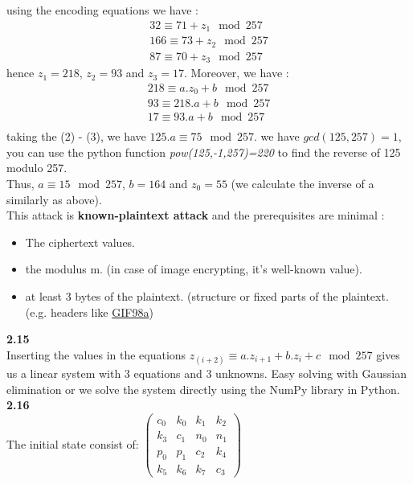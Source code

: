 using the encoding equations we have : 
\begin{align*}
    32 \equiv 71 + z_1 \mod{257} \\
    166 \equiv 73 + z_2 \mod{257}\\
    87 \equiv 70 + z_3 \mod{257}
\end{align*}
hence $z_1 = 218$, $z_2 = 93$ and $z_3 = 17$. Moreover, we have : 
\begin{align*}
    218 \equiv a.z_0 + b \mod{257} \\
     93 \equiv 218.a + b \mod{257} \\
    17 \equiv 93.a + b \mod{257} \\
\end{align*}
taking the (2) - (3), we have $125.a \equiv 75 \mod{257}$. we have $gcd(125,257)=1$, you can use the python function \textit{pow(125,-1,257)=220} to find the reverse of 125 modulo 257.\\
Thus, $a \equiv 15 \mod{257}$, $b=164$ and $z_0 = 55$ (we calculate the inverse of a similarly as above).\\
This attack is \textbf{known-plaintext attack} and the prerequisites are minimal : \begin{itemize}
    \item The ciphertext values.
    \item the modulus m. (in case of image encrypting, it's well-known value).
    \item at least 3 bytes of the plaintext. (structure or fixed parts of the plaintext. (e.g. headers like \underline{GIF98a})
\end{itemize}
 
\textbf{2.15}\\
Inserting the values in the equations $z_(i+2) \equiv a.z_{i+1} + b.z_i+c \mod{257}$ gives us a linear system with 3 equations and 3 unknowns. Easy solving with Gaussian elimination or we solve the system directly using the NumPy library in Python.\\

\textbf{2.16}\\
The initial state consist of:
$\begin{pmatrix}
    c_0 & k_0&k_1 & k_2\\
    k_3 & c_1 & n_0 & n_1 \\
    p_0 & p_1 & c_2 & k_4 \\
    k_5 & k_6 & k_7 & c_3
\end{pmatrix}$

